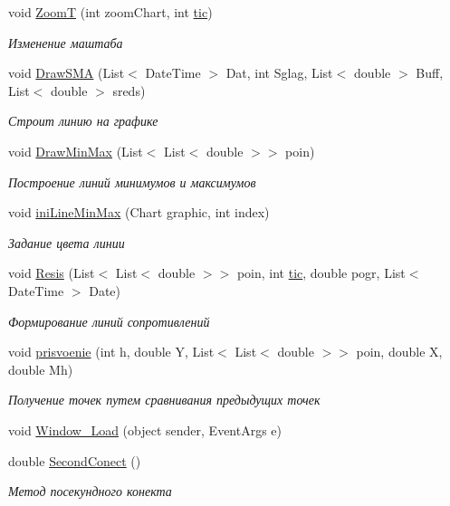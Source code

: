 \begin{DoxyCompactItemize}
void \hyperlink{class_client_1_1_windowd_aac30e6623a96e0bc508e9f4e82d4bb65}{ZoomT} (int zoom\+Chart, int \hyperlink{class_client_1_1_windowd_af0c658d1138b70eeafdbc105ec2d7a81}{tic})
\begin{DoxyCompactList}\small\item\em Изменение маштаба \end{DoxyCompactList}\item 
void \hyperlink{class_client_1_1_windowd_ad43dbe14134a90f8cd6acf4da36e485c}{Draw\+S\+MA} (List$<$ Date\+Time $>$ Dat, int Sglag, List$<$ double $>$ Buff, List$<$ double $>$ sreds)
\begin{DoxyCompactList}\small\item\em Строит линию на графике \end{DoxyCompactList}\item 
void \hyperlink{class_client_1_1_windowd_a84177c165ee297b49e25c6b5da053c12}{Draw\+Min\+Max} (List$<$ List$<$ double $>$$>$ poin)
\begin{DoxyCompactList}\small\item\em Построение линий минимумов и максимумов \end{DoxyCompactList}\item 
void \hyperlink{class_client_1_1_windowd_a7c775dee3ca111b2a04d2821b3daf35f}{ini\+Line\+Min\+Max} (Chart graphic, int index)
\begin{DoxyCompactList}\small\item\em Задание цвета линии \end{DoxyCompactList}\item 
void \hyperlink{class_client_1_1_windowd_ae28446da17026602dc8e9146af4c542d}{Resis} (List$<$ List$<$ double $>$$>$ poin, int \hyperlink{class_client_1_1_windowd_af0c658d1138b70eeafdbc105ec2d7a81}{tic}, double pogr, List$<$ Date\+Time $>$ Date)
\begin{DoxyCompactList}\small\item\em Формирование линий сопротивлений \end{DoxyCompactList}\item 
void \hyperlink{class_client_1_1_windowd_a8b8c230d223b1ba05dd936ff7cbc6e60}{prisvoenie} (int h, double Y, List$<$ List$<$ double $>$$>$ poin, double X, double Mh)
\begin{DoxyCompactList}\small\item\em Получение точек путем сравнивания предыдущих точек \end{DoxyCompactList}\item 
void \hyperlink{class_client_1_1_windowd_a8e1e4f8f41d93b2961b1a4733c1c2ebc}{Window\+\_\+\+Load} (object sender, Event\+Args e)
\item 
double \hyperlink{class_client_1_1_windowd_acf6504da17d839fd206b3fe0710db4ec}{Second\+Conect} ()
\begin{DoxyCompactList}\small\item\em Метод посекундного конекта \end{DoxyCompactList}\end{DoxyCompactItemize}
